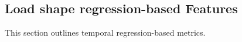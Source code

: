 \subsection{Load shape regression-based Features}
\label{sec:regressionmetrics}

This section outlines temporal regression-based metrics.